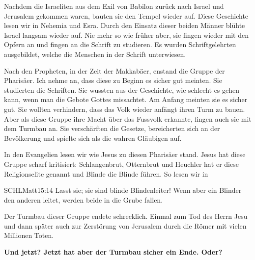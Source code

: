 \documentclass[12pt]{../../inc/mybib}
\newenvironment{block}[1][]{%
  \vspace{1.5em}%
  \noindent\textbf{#1}\par%
  \vspace{0.0em}%
}{%
  \vspace{1em}%
}
\begin{document}
\begin{block}
    Nachdem die Israeliten aus dem Exil von Babilon zurück nach Israel und Jerusalem gekommen waren, bauten sie den Tempel wieder auf. Diese Geschichte lesen wir in Nehemia und Esra. Durch den Einsatz dieser beiden Männer blühte Israel langsam wieder auf. Nie mehr so wie früher aber, sie fingen wieder mit den Opfern an und fingen an die Schrift zu studieren. Es wurden Schriftgelehrten ausgebildet, welche die Menschen in der Schrift unterwiesen. 
    
    Nach den Propheten, in der Zeit der Makkabäer, enstand die Gruppe der Pharisäer. Ich nehme an, dass diese zu Beginn es sicher gut meinten. Sie studierten die Schriften. Sie wussten aus der Geschichte, wie schlecht es gehen kann, wenn man die Gebote Gottes missachtet. Am Anfang meinten sie es sicher gut. Sie wollten verhindern, dass das Volk wieder anfängt ihren Turm zu bauen. Aber als diese Gruppe ihre Macht über das Fussvolk erkannte, fingen auch sie mit dem Turmbau an. Sie verschärften die Gesetze, bereicherten sich an der Bevölkerung und spielte sich als die wahren Gläubigen auf.
    
    In den Evangelien lesen wir wie Jesus zu diesen Pharisäer stand. Jesus hat diese Gruppe scharf kritisiert:  Schlangenbrut, Otternbrut und Heuchler hat er diese Religionselite genannt und Blinde die Blinde führen. So lesen wir in
    \begin{bibelbox}{SCHL}{Matt}{15:14}
        Lasst sie; sie sind blinde Blindenleiter! Wenn aber ein Blinder den anderen leitet, werden beide in die Grube fallen.
    \end{bibelbox} 
    Der Turmbau dieser Gruppe endete schrecklich. Einmal zum Tod des Herrn Jesu und dann später auch zur Zerstörung von Jerusalem durch die Römer mit vielen Millionen Toten. 
    
    \textbf{Und jetzt? Jetzt hat aber der Turmbau sicher ein Ende. Oder?}
\end{block}
\end{document}
